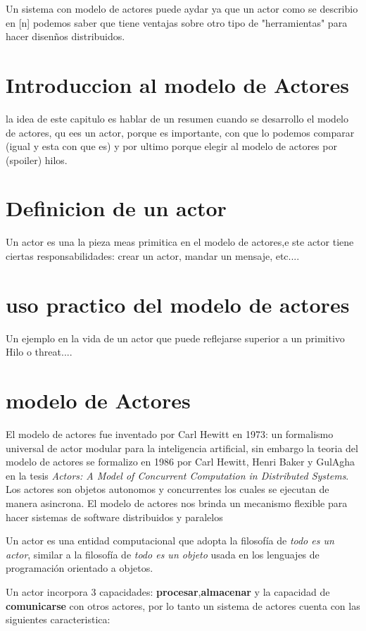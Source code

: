 Un sistema con modelo de actores puede aydar ya que un actor como se describio en [n]
podemos saber que tiene ventajas sobre otro tipo de "herramientas" para hacer
disen\~nos distribuidos.


\section{Introduccion al modelo de Actores}

la idea de este capitulo es hablar de un resumen cuando se desarrollo el modelo de actores, qu ees un actor, porque es importante,  con que lo podemos comparar (igual y esta con que es) y por ultimo porque elegir al modelo de actores por (spoiler) hilos.

\section{Definicion de un actor}
Un actor es una la pieza meas primitica en el modelo de actores,e ste actor tiene ciertas responsabilidades: crear un actor, mandar un mensaje, etc....
\section{uso practico del modelo de actores}
Un ejemplo en la vida de un actor que puede reflejarse superior a un primitivo Hilo o threat....


\section{modelo de Actores}


El modelo de actores fue inventado por Carl Hewitt  en 1973: un formalismo
universal de actor modular para la inteligencia artificial, sin embargo la
teoria del modelo de actores se formalizo en 1986 por Carl Hewitt, Henri Baker y
GulAgha en la  tesis \emph{Actors: A Model of Concurrent Computation in
  Distributed Systems}. Los actores son objetos autonomos y concurrentes los
cuales se ejecutan de manera asincrona. El modelo de actores  nos brinda un
mecanismo flexible para  hacer sistemas de software  distribuidos y paralelos

Un actor es una entidad computacional que adopta la filosof\'ia de \emph{todo es un actor}, similar a la filosof\'ia de \emph{todo es un objeto} usada en los lenguajes de programaci\'on orientado a objetos.


Un actor  incorpora 3 capacidades: \textbf{procesar},\textbf{almacenar} y   la capacidad de \textbf{comunicarse} con otros actores, por lo tanto un sistema de actores cuenta con las siguientes caracteristica:

